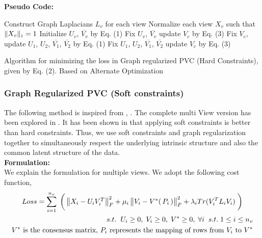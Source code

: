 \documentclass[a4paper]{article}
\begin{document}
	\noindent
	\textbf{Pseudo Code:}
	\begin{algorithm}
		Construct Graph Laplacians $L_{v}$ for each view\;
		Normalize each view $X_{v}$ such that $\|X_{v}\|_{\text{\tiny1}} = 1 $\;
		Initialize  $U_{v}$, $\overline{V_{v}}$ by Eq. (1)\;
		Fix $U_{v}$, $\overline{V_{v}}$ update $V_{c}$ by Eq. (3)\;		
		{
			{
				Fix $V_{c}$, update $U_{1}$, $U_{2}$, $\overline{V_{1}}$, $\overline{V_{2}}$ by Eq. (1)\;
			}
			Fix $U_{1}$, $U_{2}$, $\overline{V_{1}}$, $\overline{V_{2}}$ update $V_{c}$ by Eq. (3)\;
		}						
		\caption{Algorithm for minimizing the loss in Graph regularized PVC (Hard Constraints), given by Eq. (2). Based on Alternate Optimization}
	\end{algorithm}

	\pagebreak

	\subsubsection{Graph Regularized PVC (Soft constraints)}
	
	The following method is inspired from \cite{nmfsdm}, \cite{GReg}. The complete multi View version has been explored in \cite{wangfeature}. It has been shown in \cite{nmfsdm} that applying soft constraints is better than hard constraints. Thus, we use soft constraints and graph regularization together to simultaneously respect the underlying intrinsic structure and also the common latent structure of the data.\\	
	
	\noindent
	\textbf{Formulation:}\\
	We explain the formulation for multiple views. We adopt the following cost function,
	\begin{multline}	
	Loss = \displaystyle\sum_{i=1}^{n_{v}} \; \bigg(\begin{Vmatrix} X_{i}-U_{i}V^{T}_{i} \end{Vmatrix}^{2}_{F}	
		+ \mu_{i}\begin{Vmatrix} V_{i}-V^{*}(\, P_{i} \, ) \end{Vmatrix}^{2}_{F}
		+ \lambda_{i}Tr(V^{T}_{i}L_{i}V_{i}) \; \bigg)\\	
		\hfill s.t. \hspace{2mm}  U_{i}\geq0,\;V_{i}\geq0,\;V^{*}\geq0,\;\forall i \;\;s.t.\; 1 \leq i \leq n_{v}\\
		\hfill V^{*} \text{ is the consensus matrix, }
		P_{i} \text{ represents the mapping of rows from } V_{i} \text{ to } V^{*}
	\end{multline}	
\end{document}
